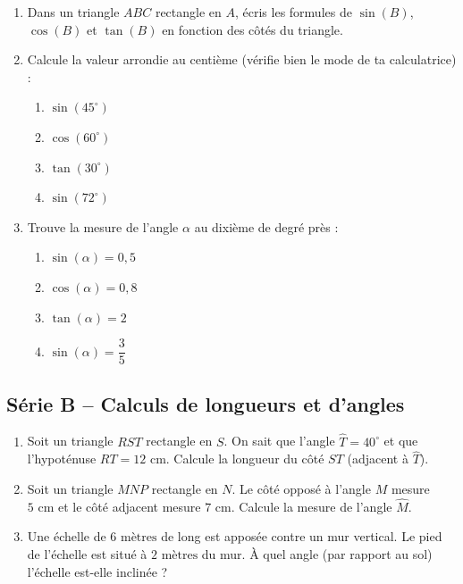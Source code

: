 \documentclass[11pt,a4paper]{article}
\newcommand{\dec}{{,}} %
\begin{document}
\begin{enumerate}[label=\textbf{\arabic*.}]

\item Dans un triangle $ABC$ rectangle en $A$, écris les formules de $\sin(B)$, $\cos(B)$ et $\tan(B)$ en fonction des côtés du triangle.

\item Calcule la valeur arrondie au centième (vérifie bien le mode de ta calculatrice) :
\begin{enumerate}[label=\alph*)]
  \item $\sin(45^\circ)$ \qquad
  \item $\cos(60^\circ)$ \qquad
  \item $\tan(30^\circ)$ \qquad
  \item $\sin(72^\circ)$
\end{enumerate}

\item Trouve la mesure de l'angle $\alpha$ au dixième de degré près :
\begin{enumerate}[label=\alph*)]
  \item $\sin(\alpha) = 0\dec 5$ \qquad
  \item $\cos(\alpha) = 0\dec 8$ \qquad
  \item $\tan(\alpha) = 2$ \qquad
  \item $\sin(\alpha) = \dfrac{3}{5}$
\end{enumerate}

\end{enumerate}

\subsection{Série B -- Calculs de longueurs et d'angles}

\begin{enumerate}[label=\textbf{\arabic*.},start=4]

\item Soit un triangle $RST$ rectangle en $S$. On sait que l'angle $\widehat{T} = 40^\circ$ et que l'hypoténuse $RT = 12\text{ cm}$. Calcule la longueur du côté $ST$ (adjacent à $\widehat{T}$).

\item Soit un triangle $MNP$ rectangle en $N$. Le côté opposé à l'angle $M$ mesure $5\text{ cm}$ et le côté adjacent mesure $7\text{ cm}$. Calcule la mesure de l'angle $\widehat{M}$.

\item Une échelle de $6\text{ mètres}$ de long est apposée contre un mur vertical. Le pied de l'échelle est situé à $2\text{ mètres}$ du mur. À quel angle (par rapport au sol) l'échelle est-elle inclinée ?

\end{enumerate}
\end{document}
